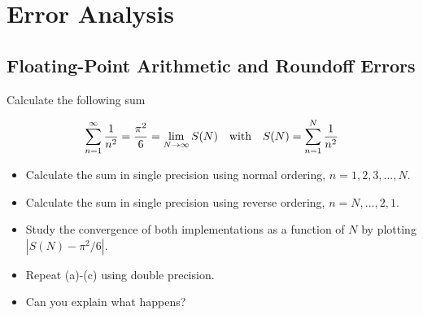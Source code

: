 \section{Error Analysis}

\subsection{Floating-Point Arithmetic and Roundoff Errors}

\begin{exercise}

	Calculate the following sum

	\[
		\sum_{n=1}^\infty {1\over n^2}={\pi^2\over 6}
		=\lim_{N\to\infty} S(N)
		\quad
		\text{with}
		\quad
		S(N)=\sum_{n=1}^N {1\over n^2}
	\]

	\begin{itemize}
		\item Calculate the sum in single precision using normal ordering,
		      $n=1,2,3,\ldots,N$.
		\item Calculate the sum in single precision using reverse ordering,
		      $n=N,\ldots,2,1$.
		\item Study the convergence of both implementations as a function of $N$
		      by plotting $|S(N)-\pi^2/6|$.
		\item Repeat (a)-(c) using double precision.
		\item Can you explain what happens?
	\end{itemize}

\end{exercise}

